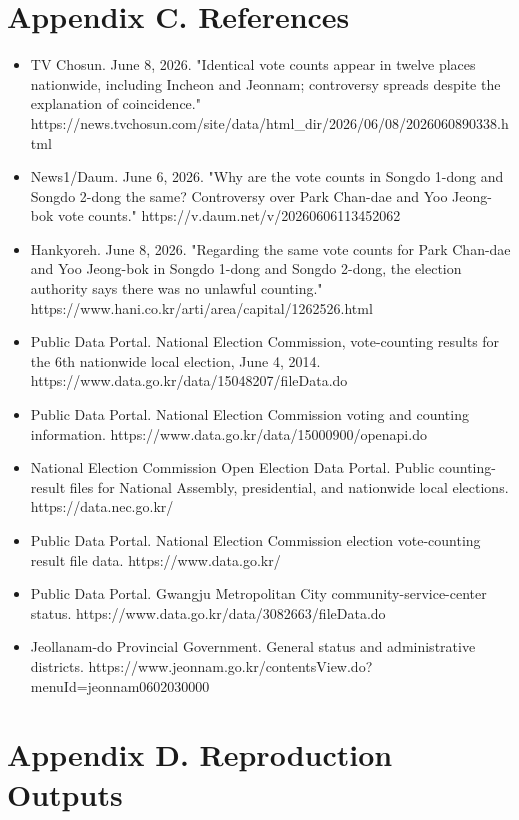 \documentclass[preprint]{IEIE}
\begin{document}
\section*{Appendix C. References}

\begin{itemize}
\item TV Chosun. June 8, 2026. "Identical vote counts appear in twelve places nationwide, including Incheon and Jeonnam; controversy spreads despite the explanation of coincidence." https://news.tvchosun.com/site/data/html\_dir/2026/06/08/2026060890338.html
\item News1/Daum. June 6, 2026. "Why are the vote counts in Songdo 1-dong and Songdo 2-dong the same? Controversy over Park Chan-dae and Yoo Jeong-bok vote counts." https://v.daum.net/v/20260606113452062
\item Hankyoreh. June 8, 2026. "Regarding the same vote counts for Park Chan-dae and Yoo Jeong-bok in Songdo 1-dong and Songdo 2-dong, the election authority says there was no unlawful counting." https://www.hani.co.kr/arti/area/capital/1262526.html
\item Public Data Portal. National Election Commission, vote-counting results for the 6th nationwide local election, June 4, 2014. https://www.data.go.kr/data/15048207/fileData.do
\item Public Data Portal. National Election Commission voting and counting information. https://www.data.go.kr/data/15000900/openapi.do
\item National Election Commission Open Election Data Portal. Public counting-result files for National Assembly, presidential, and nationwide local elections. https://data.nec.go.kr/
\item Public Data Portal. National Election Commission election vote-counting result file data. https://www.data.go.kr/
\item Public Data Portal. Gwangju Metropolitan City community-service-center status. https://www.data.go.kr/data/3082663/fileData.do
\item Jeollanam-do Provincial Government. General status and administrative districts. https://www.jeonnam.go.kr/contentsView.do?menuId=jeonnam0602030000
\end{itemize}

\section*{Appendix D. Reproduction Outputs}
\end{document}

